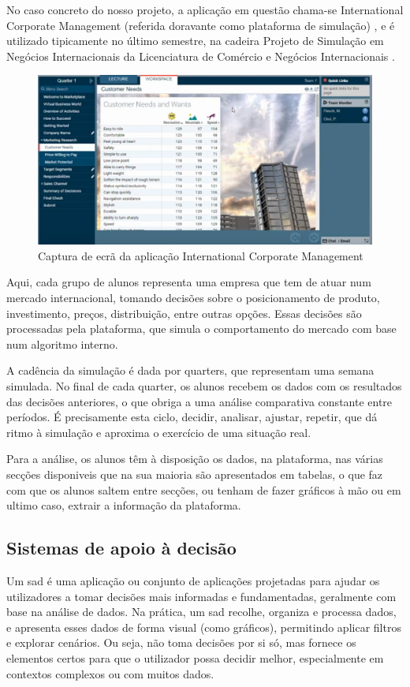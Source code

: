 No caso concreto do nosso projeto, a aplicação em questão chama-se International Corporate Management (referida doravante como plataforma de simulação) \cite{MarketplaceSim_2025}, e é utilizado tipicamente no último semestre, na cadeira Projeto de Simulação em Negócios Internacionais da Licenciatura de Comércio e Negócios Internacionais \cite{FUC_ISCAL_2025}. 

\begin{figure}[h]
    \centering
    \includegraphics[width=\textwidth]{./img/marketplace1}
 \caption{Captura de ecrã da aplicação International Corporate Management}
 \end{figure}

Aqui, cada grupo de alunos representa uma empresa que tem de atuar num mercado internacional, tomando decisões sobre o posicionamento de produto, investimento, preços, distribuição, entre outras opções. Essas decisões são processadas pela plataforma, que simula o comportamento do mercado com base num algoritmo interno. 

A cadência da simulação é dada por quarters, que representam uma semana simulada. No final de cada quarter, os alunos recebem os dados com os resultados das decisões anteriores, o que obriga a uma análise comparativa constante entre períodos. É precisamente esta ciclo, decidir, analisar, ajustar, repetir, que dá ritmo à simulação e aproxima o exercício de uma situação real.

Para a análise, os alunos têm à disposição os dados, na plataforma,  nas várias secções disponiveis que na sua maioria são apresentados em tabelas, o que faz com que os alunos saltem entre secções, ou tenham de fazer gráficos à mão ou em ultimo caso, extrair a informação da plataforma. 

\subsection{Sistemas de apoio à decisão}
\label{sec:sad}
Um \gls{sad} é uma aplicação ou conjunto de aplicações projetadas para ajudar os utilizadores a tomar decisões mais informadas e fundamentadas, geralmente com base na análise de dados. Na prática, um \gls{sad} recolhe, organiza e processa dados, e apresenta esses dados de forma visual (como gráficos), permitindo aplicar filtros e explorar cenários. Ou seja, não toma decisões por si só, mas fornece os elementos certos para que o utilizador possa decidir melhor, especialmente em contextos complexos ou com muitos dados.


